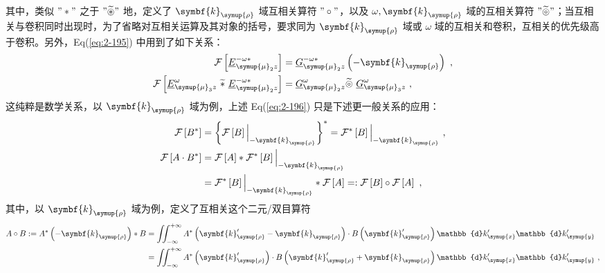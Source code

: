 其中，类似 $"*"$ 之于 $"\widetilde \circledast"$ 地，定义了 $\symbf{k}_{\symup{\rho}}$ 域互相关算符 $"\circ"$，以及 $\omega, \symbf{k}_{\symup{\rho}}$ 域的互相关算符 $"\widetilde \circledcirc"$；当互相关与卷积同时出现时，为了省略对互相关运算及其对象的括号，要求同为 $\symbf{k}_{\symup{\rho}}$ 域或 $\omega$ 域的互相关和卷积，互相关的优先级高于卷积。另外，Eq(\ref{eq:2-195}) 中用到了如下关系：
\begin{subequations} \label{eq:2-196}
	\abovedisplayskip=10pt
	\belowdisplayskip=10pt
	\begin{align}
		\mathcal F \left[ \underline{E}^{-\omega*}_{{\symup{\mu}}_2 z} \right] &= \underline{G}^{-\omega*}_{{\symup{\mu}}_2 z} \left( - \symbf{k}_{\symup{\rho}} \right) \label{eq:2-196a}~, \\ \mathcal F \left[ \underline{E}^\omega_{{\symup{\mu}}_3 z}\ \widetilde *\ \underline{E}^{-\omega*}_{{\symup{\mu}}_2 z} \right] &= \underline{G}^{\omega}_{{\symup{\mu}}_2 z} \widetilde \circledcirc\ \underline{G}^{\omega}_{{\symup{\mu}}_3 z} \label{eq:2-196b}~,
	\end{align}
\end{subequations}
这纯粹是数学关系，以 $\symbf{k}_{\symup{\rho}}$ 域为例，上述 Eq(\ref{eq:2-196}) 只是下述更一般关系的应用：
\begin{subequations} \label{eq:2-197}
	\abovedisplayskip=10pt
	\belowdisplayskip=10pt
	\begin{align}
		\mathcal F \left[ B^* \right] &= \left\{ \mathcal F \left[ B \right] \Big|_{- \symbf{k}_{\symup{\rho}}} \right\}^* = \mathcal F^* \left[ B \right] \Big|_{- \symbf{k}_{\symup{\rho}}} \label{eq:2-197a}~, \\ \mathcal F \left[ A \cdot B^* \right] &= \mathcal F \left[ A \right] * \mathcal F^* \left[ B \right] \Big|_{- \symbf{k}_{\symup{\rho}}} \label{eq:2-197b} \\ &= \mathcal F^* \left[ B \right] \Big|_{- \symbf{k}_{\symup{\rho}}} * \mathcal F \left[ A \right] =: \mathcal F \left[ B \right] \circ \mathcal F \left[ A \right] \label{eq:2-197c}~,
	\end{align}
\end{subequations}
其中，以 $\symbf{k}_{\symup{\rho}}$ 域为例，定义了互相关这个二元/双目算符
\begin{subequations} \label{eq:2-198}
	\abovedisplayskip=10pt
	\belowdisplayskip=10pt
	\begin{align}
		A \circ B := A^* \left( - \symbf{k}_{\symup{\rho}} \right) * B &= \iint_{-\infty}^{+\infty} A^* \left( \symbf{k}'_{\symup{\rho}} - \symbf{k}_{\symup{\rho}} \right) \cdot B \left( \symbf{k}'_{\symup{\rho}} \right) {\mathbb{d}{k'_{\symup{x}}} \mathbb{d}{k'_{\symup{y}}}} \label{eq:2-198a} \\ &= \iint_{-\infty}^{+\infty} A^* \left( \symbf{k}'_{\symup{\rho}} \right) \cdot B \left( \symbf{k}'_{\symup{\rho}} + \symbf{k}_{\symup{\rho}} \right) {\mathbb{d}{k'_{\symup{x}}} \mathbb{d}{k'_{\symup{y}}}} \label{eq:2-198b}~, 
	\end{align}
\end{subequations}
